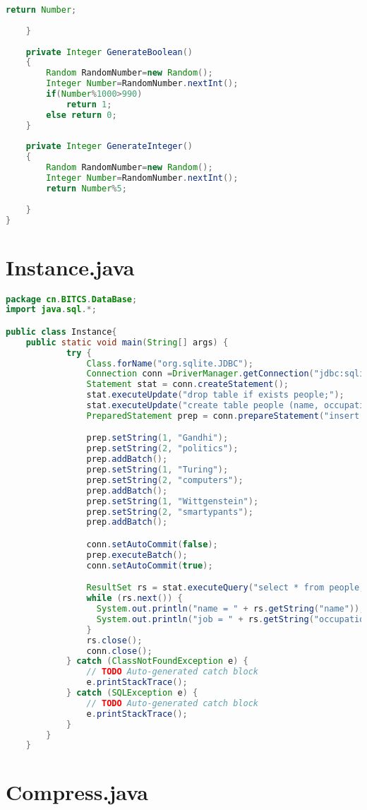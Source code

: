 \begin{lstlisting}[language = Java]
		return Number;
		
	}
	
	private Integer GenerateBoolean()
	{
		Random RandomNumber=new Random();
		Integer Number=RandomNumber.nextInt();
		if(Number%1000>990)
			return 1;
		else return 0;
	}
	
	private Integer GenerateInteger()
	{
		Random RandomNumber=new Random();
		Integer Number=RandomNumber.nextInt();
		return Number%5;
		
	}
}
\end{lstlisting}

\clearpage

\clearpage
\section{Instance.java}
\label{Section A.2}

\begin{lstlisting}[language = Java]
package cn.BITCS.DataBase;
import java.sql.*;

public class Instance{
	public static void main(String[] args) {
			try {
				Class.forName("org.sqlite.JDBC");
				Connection conn =DriverManager.getConnection("jdbc:sqlite:info");
				Statement stat = conn.createStatement();
				stat.executeUpdate("drop table if exists people;");
				stat.executeUpdate("create table people (name, occupation);");
				PreparedStatement prep = conn.prepareStatement("insert into people values (?, ?);");

				prep.setString(1, "Gandhi");
				prep.setString(2, "politics");
				prep.addBatch();
				prep.setString(1, "Turing");
				prep.setString(2, "computers");
				prep.addBatch();
				prep.setString(1, "Wittgenstein");
				prep.setString(2, "smartypants");
				prep.addBatch();

				conn.setAutoCommit(false);
				prep.executeBatch();
				conn.setAutoCommit(true);

				ResultSet rs = stat.executeQuery("select * from people;");
				while (rs.next()) {
				  System.out.println("name = " + rs.getString("name"));
				  System.out.println("job = " + rs.getString("occupation"));
				}
				rs.close();
				conn.close();
			} catch (ClassNotFoundException e) {
				// TODO Auto-generated catch block
				e.printStackTrace();
			} catch (SQLException e) {
				// TODO Auto-generated catch block
				e.printStackTrace();
			}
		}
	}\end{lstlisting}

\section{Compress.java}
\label{Section A.3}


